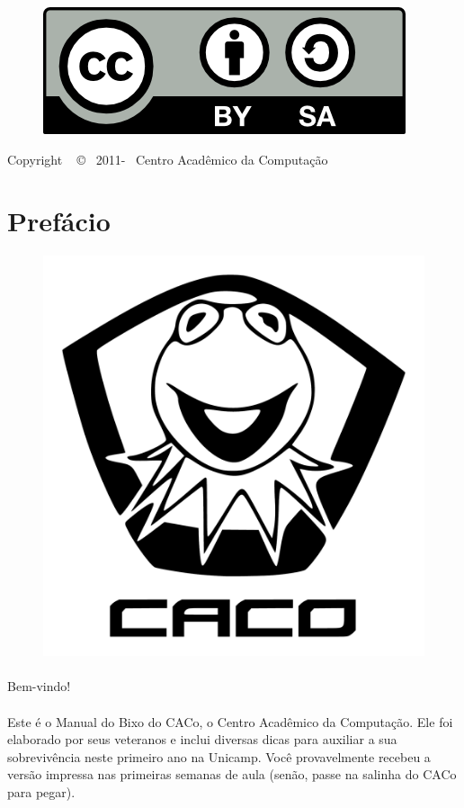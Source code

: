 \documentclass[a4paper,10pt,twocolumn]{book}
\begin{document}
\begin{figure}[H]
    \centering
    \includegraphics[scale=.8]{img/by-sa.png}
\end{figure}

\begin{center}
    Copyright ~ \copyright ~ 2011-\the\year ~ Centro Acadêmico da Computação
\end{center}

\clearpage

\section*{Prefácio}
\begin{figure}[H]
    \centering
    \includegraphics[width=.65\textwidth]{img/caco/logo.pdf}
\end{figure}
\paragraph{}
Bem-vindo!

\paragraph{}
Este é o Manual do Bixo do CACo, o Centro Acadêmico da Computação.  Ele foi
elaborado por seus veteranos e inclui diversas dicas para auxiliar a sua
sobrevivência neste primeiro ano na Unicamp.  Você provavelmente recebeu a
versão impressa nas primeiras semanas de aula (senão, passe na salinha do CACo
para pegar).
\end{document}
